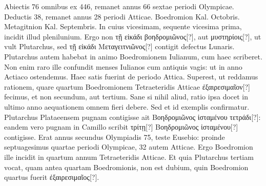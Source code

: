 Abiectis 76 omnibus ex 446, remanet annus 66
sextae periodi Olympicae.
Deductis 38, remanet annus 28 periodi Atticae.
Boedromion Kal. Octobris.
Metagitnion Kal. Septembris.
In cuius
vicesimam, sequente vicesima prima, incidit illud plenilunium.
Ergo non \textgreek{τῇ εἰκάδι βοηδρομιῶνος[?]},
 aut \textgreek{μυστηρίοις[?]},
 ut vult Plutarchus, sed \textgreek{τῇ εἰκάδι Μεταγειτνιῶνος[?]}
contigit defectus Lunaris.
Plutarchus autem habebat
in animo Boedromionem Iulianum, cum haec scriberet.
Non
enim raro ille confundit menses Iulianos cum antiquis vagis: ut in anno
Actiaco ostendemus.
Haec satis fuerint de periodo Attica.
Superest,
ut reddamus rationem, quare quartum Boedromionem Tetraeteridis
Atticae \textgreek{ἐξαιρεσιμαῖον[?]} fecimus, et non secundum, aut tertium.
Sane si nihil aliud, ratio ipsa docet in ultimo anno aequationem
omnem fieri debere.
Sed et id exemplis confirmatur.
Plutarchus Plataeensem pugnam contigisse ait
 \textgreek{Βοηδρομιῶνος ἱσταμένου
τετράδι[?]}:
eandem vero pugnam in Camillo scribit \textgreek{τρίτῃ[?] Βοηδρομιῶνος
ἱσταμένου[?]}
contigisse.
Erat annus secundus Olympiadis 75, teste
Eusebio: proinde septuagesimus quartae periodi Olympicae, 32
autem Atticae.
Ergo Boedromion ille incidit in quartum annum
Tetraeteridis Atticae.
Et quia Plutarchus tertiam vocat, quam
antea quartam Boedromionis, non est dubium, quin Boedromion
quartus fuerit \textgreek{ἐξαιρεσιμαῖος[?]}.
%
